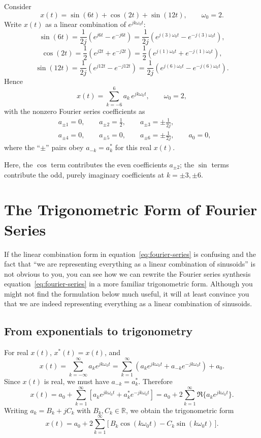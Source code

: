 \documentclass{ee102_notes}
\begin{document}
Consider
\[
x(t)=\sin(6t)+\cos(2t)+\sin(12t),\qquad \omega_0=2.
\]
Write $x(t)$ as a linear combination of $e^{jk\omega_0 t}$:
\[
\sin(6t)=\frac{1}{2j}\!\left(e^{j6t}-e^{-j6t}\right)
= \frac{1}{2j}\!\left(e^{j(3)\omega_0 t}-e^{-j(3)\omega_0 t}\right),
\]
\[
\cos(2t)=\frac{1}{2}\!\left(e^{j2t}+e^{-j2t}\right)
=\frac{1}{2}\!\left(e^{j(1)\omega_0 t}+e^{-j(1)\omega_0 t}\right),
\]
\[
\sin(12t)=\frac{1}{2j}\!\left(e^{j12t}-e^{-j12t}\right)
= \frac{1}{2j}\!\left(e^{j(6)\omega_0 t}-e^{-j(6)\omega_0 t}\right).
\]
Hence
\[
x(t)=\sum_{k=-6}^{6} a_k\,e^{jk\omega_0 t},\qquad \omega_0=2,
\]
with the nonzero Fourier series coefficients as
\[
\begin{aligned}
&a_{\pm 1} = 0,\qquad a_{\pm 2}=\frac{1}{2},\qquad a_{\pm 3}=\pm \frac{1}{2j},\\
&a_{\pm 4}=0,\qquad a_{\pm 5}=0,\qquad a_{\pm 6}=\pm \frac{1}{2j},\qquad a_0=0,
\end{aligned}
\]
where the ``$\pm$'' pairs obey $a_{-k}=a_k^\ast$ for this real $x(t)$. 

Here, the $\cos$ term contributes the even coefficients $a_{\pm2}$; the $\sin$ terms contribute the odd, purely imaginary coefficients at $k=\pm3,\pm6$.

\section{The Trigonometric Form of Fourier Series}
If the linear combination form in equation~\eqref{eq:fourier-series} is confusing and the fact that ``we are representing everything as a linear combination of sinusoids'' is not obvious to you, you can see how we can rewrite the Fourier series synthesis equation~\eqref{eq:fourier-series} in a more familiar trigonometric form. Although you might not find the formulation below much useful, it will at least convince you that we are indeed representing everything as a linear combination of sinusoids.
\subsection{From exponentials to trigonometry}

For real $x(t)$, $x^\ast(t)=x(t)$, and
\[
x(t)=\sum_{k=-\infty}^{\infty} a_k e^{jk\omega_0 t}
=\sum_{k=1}^{\infty}\!\left( a_k e^{jk\omega_0 t}+a_{-k} e^{-jk\omega_0 t}\right)+a_0.
\]
Since $x(t)$ is real, we must have $a_{-k}=a_k^\ast$. Therefore
\[
x(t)=a_0+\sum_{k=1}^{\infty}\!\left[a_k e^{jk\omega_0 t}+a_k^\ast e^{-jk\omega_0 t}\right]
= a_0+ 2\sum_{k=1}^{\infty} \Re\!\big\{a_k e^{jk\omega_0 t}\big\}.
\]
Writing $a_k=B_k+jC_k$ with $B_k,C_k\in\mathbb{R}$, we obtain the trigonometric form
\begin{equation}
\,x(t)=a_0+2\sum_{k=1}^{\infty}\!\big[\,B_k\cos(k\omega_0 t)-C_k\sin(k\omega_0 t)\,\big].\,
\label{eq:trig-form}
\end{equation}
\end{document}
